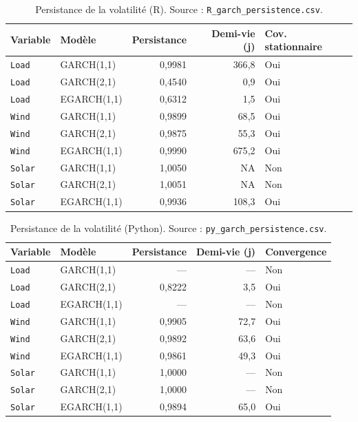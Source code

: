 \begin{table}[H]
\centering
\caption{Persistance de la volatilité (R).
Source : \texttt{R\_garch\_persistence.csv}.}
\label{tab:garch_pers_r}
\small
\begin{tabular}{llrrl}
\toprule
Variable & Modèle & Persistance & Demi-vie (j) & Cov. stationnaire \\
\midrule
\texttt{Load}  & GARCH(1,1)  & 0{,}9981 & 366{,}8 & Oui \\
\texttt{Load}  & GARCH(2,1)  & 0{,}4540 & 0{,}9 & Oui \\
\texttt{Load}  & EGARCH(1,1) & 0{,}6312 & 1{,}5 & Oui \\
\texttt{Wind}  & GARCH(1,1)  & 0{,}9899 & 68{,}5 & Oui \\
\texttt{Wind}  & GARCH(2,1)  & 0{,}9875 & 55{,}3 & Oui \\
\texttt{Wind}  & EGARCH(1,1) & 0{,}9990 & 675{,}2 & Oui \\
\texttt{Solar} & GARCH(1,1)  & 1{,}0050 & NA & Non \\
\texttt{Solar} & GARCH(2,1)  & 1{,}0051 & NA & Non \\
\texttt{Solar} & EGARCH(1,1) & 0{,}9936 & 108{,}3 & Oui \\
\bottomrule
\end{tabular}
\end{table}

\begin{table}[H]
\centering
\caption{Persistance de la volatilité (Python).
Source : \texttt{py\_garch\_persistence.csv}.}
\label{tab:garch_pers_py}
\small
\begin{tabular}{llrrl}
\toprule
Variable & Modèle & Persistance & Demi-vie (j) & Convergence \\
\midrule
\texttt{Load}  & GARCH(1,1)  & --- & --- & Non \\
\texttt{Load}  & GARCH(2,1)  & 0{,}8222 & 3{,}5 & Oui \\
\texttt{Load}  & EGARCH(1,1) & --- & --- & Non \\
\texttt{Wind}  & GARCH(1,1)  & 0{,}9905 & 72{,}7 & Oui \\
\texttt{Wind}  & GARCH(2,1)  & 0{,}9892 & 63{,}6 & Oui \\
\texttt{Wind}  & EGARCH(1,1) & 0{,}9861 & 49{,}3 & Oui \\
\texttt{Solar} & GARCH(1,1)  & 1{,}0000 & --- & Non \\
\texttt{Solar} & GARCH(2,1)  & 1{,}0000 & --- & Non \\
\texttt{Solar} & EGARCH(1,1) & 0{,}9894 & 65{,}0 & Oui \\
\bottomrule
\end{tabular}
\end{table}

